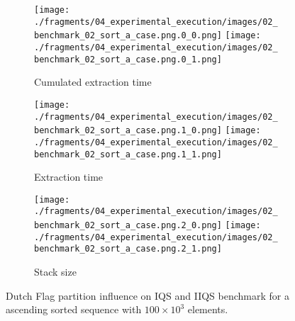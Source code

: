 \begin{figure}
    \centering
    \begin{subfigure}[b]{\textwidth}
        \centering
        \texttt{[image: ./fragments/04\_experimental\_execution/images/02\_benchmark\_02\_sort\_a\_case.png.0\_0.png]}
        \texttt{[image: ./fragments/04\_experimental\_execution/images/02\_benchmark\_02\_sort\_a\_case.png.0\_1.png]}
        \caption{Cumulated extraction time}
        \label{FIG:PARTITION_SCHEME_01_ASCENDING__0_0}
    \end{subfigure}

    \begin{subfigure}[b]{\textwidth}
        \centering
        \texttt{[image: ./fragments/04\_experimental\_execution/images/02\_benchmark\_02\_sort\_a\_case.png.1\_0.png]}
        \texttt{[image: ./fragments/04\_experimental\_execution/images/02\_benchmark\_02\_sort\_a\_case.png.1\_1.png]}
        \caption{Extraction time}
        \label{FIG:PARTITION_SCHEME_01_ASCENDING__0_0}
    \end{subfigure}

    \begin{subfigure}[b]{\textwidth}
        \centering
        \texttt{[image: ./fragments/04\_experimental\_execution/images/02\_benchmark\_02\_sort\_a\_case.png.2\_0.png]}
        \texttt{[image: ./fragments/04\_experimental\_execution/images/02\_benchmark\_02\_sort\_a\_case.png.2\_1.png]}
        \caption{Stack size}
        \label{FIG:PARTITION_SCHEME_01_ASCENDING__0_0}
    \end{subfigure}
    
    \caption{Dutch Flag partition influence on IQS and IIQS benchmark for a ascending sorted sequence with $100\times10^3$ elements.}
    \label{FIG:PARTITION_SCHEME_01_ASCENDING}
\end{figure}




